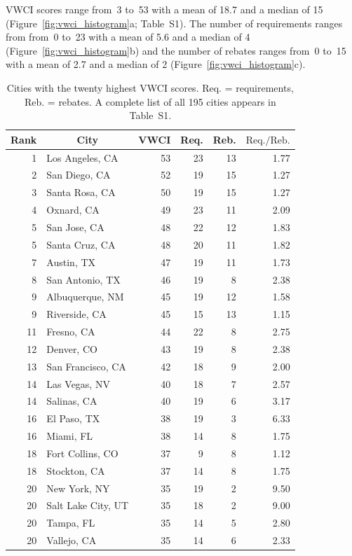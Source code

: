 \documentclass[draft,linenumbers]{agujournal}\usepackage{knitr}
\begin{document}
VWCI scores range from~3 to~53 with a mean of 18.7 and a median of 15 (Figure~\ref{fig:vwci_histogram}a; Table~S1). The number of requirements ranges from  from~0 to~23 with a mean of 5.6 and a median of 4 (Figure~\ref{fig:vwci_histogram}b) and the number of rebates ranges from~0 to~15 with a mean of 2.7 and a median of 2 (Figure~\ref{fig:vwci_histogram}c).
%
%

%
%
\begin{table}[tbp]
\centering
\caption{Cities with the twenty highest VWCI scores. Req. = requirements, Reb. = rebates. A complete list of all  195  cities appears in Table~S1.}
\label{tab:top_vwci}
\begin{tabular}{rlrrrr}
  \hline
\multicolumn{1}{c}{ Rank } & \multicolumn{1}{c}{ City } & \multicolumn{1}{c}{ VWCI } & \multicolumn{1}{c}{ Req. } & \multicolumn{1}{c}{ Reb. } & \multicolumn{1}{c}{ $\text{Req.}/\text{Reb.}$ } \\
  \hline
  1 & Los Angeles, CA &  53 &  23 &  13 & 1.77 \\
    2 & San Diego, CA &  52 &  19 &  15 & 1.27 \\
    3 & Santa Rosa, CA &  50 &  19 &  15 & 1.27 \\
    4 & Oxnard, CA &  49 &  23 &  11 & 2.09 \\
    5 & San Jose, CA &  48 &  22 &  12 & 1.83 \\
    5 & Santa Cruz, CA &  48 &  20 &  11 & 1.82 \\
    7 & Austin, TX &  47 &  19 &  11 & 1.73 \\
    8 & San Antonio, TX &  46 &  19 &   8 & 2.38 \\
    9 & Albuquerque, NM &  45 &  19 &  12 & 1.58 \\
    9 & Riverside, CA &  45 &  15 &  13 & 1.15 \\
   11 & Fresno, CA &  44 &  22 &   8 & 2.75 \\
   12 & Denver, CO &  43 &  19 &   8 & 2.38 \\
   13 & San Francisco, CA &  42 &  18 &   9 & 2.00 \\
   14 & Las Vegas, NV &  40 &  18 &   7 & 2.57 \\
   14 & Salinas, CA &  40 &  19 &   6 & 3.17 \\
   16 & El Paso, TX &  38 &  19 &   3 & 6.33 \\
   16 & Miami, FL &  38 &  14 &   8 & 1.75 \\
   18 & Fort Collins, CO &  37 &   9 &   8 & 1.12 \\
   18 & Stockton, CA &  37 &  14 &   8 & 1.75 \\
   20 & New York, NY &  35 &  19 &   2 & 9.50 \\
   20 & Salt Lake City, UT &  35 &  18 &   2 & 9.00 \\
   20 & Tampa, FL &  35 &  14 &   5 & 2.80 \\
   20 & Vallejo, CA &  35 &  14 &   6 & 2.33 \\
   \hline
\end{tabular}
\end{table}
\end{document}
